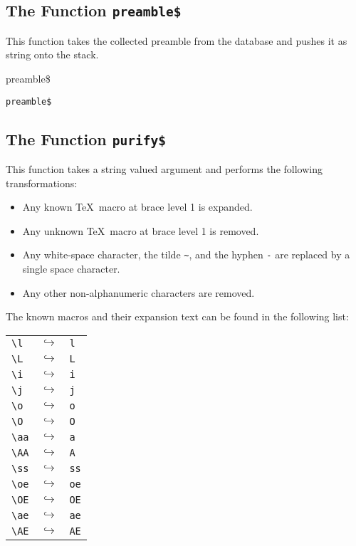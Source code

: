 \subsection{The Function \texttt{preamble\$}}%

This function takes the collected preamble from the database and
pushes it as string onto the stack.

\begin{BstFunction}{preamble\$}
\end{BstFunction}

\begin{lstlisting}[language=bst]
  preamble$
\end{lstlisting}


\subsection{The Function \texttt{purify\$}}%

This function takes a string valued argument and performs the
following transformations:

\begin{itemize}
\item Any known \TeX\ macro at brace level 1 is expanded.
\item Any unknown \TeX\ macro at brace level 1 is removed.
\item Any white-space character, the tilde \verb|~|, and the hyphen
  \verb|-| are replaced by a single space character.
\item Any other non-alphanumeric characters are removed.
\end{itemize}

The known macros and their expansion text can be found in the
following list:

\begin{tabular}{lll}
  \verb|\l|  &$\hookrightarrow$& \verb|l|\\
  \verb|\L|  &$\hookrightarrow$& \verb|L|\\
  \verb|\i|  &$\hookrightarrow$& \verb|i|\\
  \verb|\j|  &$\hookrightarrow$& \verb|j|\\
  \verb|\o|  &$\hookrightarrow$& \verb|o|\\
  \verb|\O|  &$\hookrightarrow$& \verb|O|\\
  \verb|\aa| &$\hookrightarrow$& \verb|a|\\
  \verb|\AA| &$\hookrightarrow$& \verb|A|\\
  \verb|\ss| &$\hookrightarrow$& \verb|ss|\\
  \verb|\oe| &$\hookrightarrow$& \verb|oe|\\
  \verb|\OE| &$\hookrightarrow$& \verb|OE|\\
  \verb|\ae| &$\hookrightarrow$& \verb|ae|\\
  \verb|\AE| &$\hookrightarrow$& \verb|AE|\\
\end{tabular}

